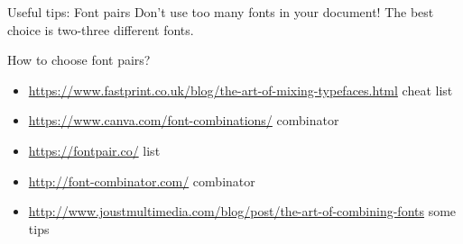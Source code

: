 \begin{frame}{Useful tips: Font pairs}\relax
    Don't use too many fonts in your document! The best choice is two-three different fonts.
    
    How to choose font pairs? 
    
    \begin{itemize}
        \item \url{https://www.fastprint.co.uk/blog/the-art-of-mixing-typefaces.html} cheat list
        \item \url{https://www.canva.com/font-combinations/} combinator
        \item \url{https://fontpair.co/} list 
        \item \url{http://font-combinator.com/} combinator
        \item \url{http://www.joustmultimedia.com/blog/post/the-art-of-combining-fonts} some tips
         
    \end{itemize}
\end{frame}

